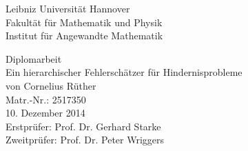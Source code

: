 \documentclass[a4paper,11pt,twoside,openany]{book}
\theoremstyle{definition}
\theoremstyle{remark}
\newcommand{\<}{\langle}
\renewcommand{\>}{\rangle}
\renewcommand{\(}{\left(}
\renewcommand{\)}{\right)}
\begin{document}
\frontmatter

\begin{titlepage} 

\begin{flushright}
 {\Large Leibniz Universität Hannover \\
 \large Fakultät für Mathematik und Physik \\
Institut für Angewandte Mathematik} \\
\end{flushright}

\centering 

\vspace{3.8cm}

\Large
 Diplomarbeit\\[2cm]\huge 
Ein hierarchischer Fehlerschätzer für Hindernisprobleme\\[2.5cm]\Large 
von Cornelius Rüther \\
Matr.-Nr.: 2517350 \\[2.5cm]
10. Dezember 2014 \\  
\vfill
Erstprüfer: Prof. Dr. Gerhard Starke\\ %
Zweitprüfer: Prof. Dr. Peter Wriggers  
\end{titlepage} 

 
\thispagestyle{empty}
\quad 
\newpage 
\thispagestyle{empty}
\quad 
\newpage

\setcounter{page}{4}





\tableofcontents

\listoffigures


\listoftables
\end{document}
